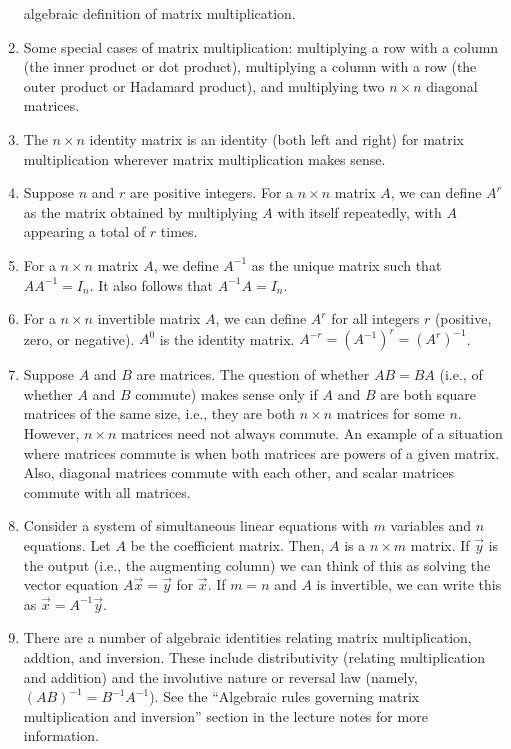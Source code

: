 \documentclass[10pt]{amsart}
\begin{document}
\begin{enumerate}
  algebraic definition of matrix multiplication.
\item Some special cases of matrix multiplication: multiplying a row
  with a column (the inner product or dot product), multiplying a
  column with a row (the outer product or Hadamard product), and
  multiplying two $n \times n$ diagonal matrices.
\item The $n \times n$ identity matrix is an identity (both left and
  right) for matrix multiplication wherever matrix multiplication
  makes sense.
\item Suppose $n$ and $r$ are positive integers. For a $n \times n$
  matrix $A$, we can define $A^r$ as the matrix obtained by
  multiplying $A$ with itself repeatedly, with $A$ appearing a total
  of $r$ times.
\item For a $n \times n$ matrix $A$, we define $A^{-1}$ as the unique
  matrix such that $AA^{-1} = I_n$. It also follows that $A^{-1}A =
  I_n$.
\item For a $n \times n$ invertible matrix $A$, we can define $A^r$
  for all integers $r$ (positive, zero, or negative). $A^0$ is the
  identity matrix. $A^{-r} = (A^{-1})^r = (A^r)^{-1}$.
\item Suppose $A$ and $B$ are matrices. The question of whether $AB =
  BA$ (i.e., of whether $A$ and $B$ commute) makes sense only if $A$
  and $B$ are both square matrices of the same size, i.e., they are
  both $n \times n$ matrices for some $n$. However, $n \times n$
  matrices need not always commute. An example of a situation where
  matrices commute is when both matrices are powers of a given
  matrix. Also, diagonal matrices commute with each other, and scalar
  matrices commute with all matrices.
\item Consider a system of simultaneous linear equations with $m$
  variables and $n$ equations. Let $A$ be the coefficient
  matrix. Then, $A$ is a $n \times m$ matrix. If $\vec{y}$ is the
  output (i.e., the augmenting column) we can think of this as solving
  the vector equation $A\vec{x} = \vec{y}$ for $\vec{x}$. If $m = n$
  and $A$ is invertible, we can write this as $\vec{x} =
  A^{-1}\vec{y}$.
\item There are a number of algebraic identities relating matrix
  multiplication, addtion, and inversion. These include distributivity
  (relating multiplication and addition) and the involutive nature or
  reversal law (namely, $(AB)^{-1} = B^{-1}A^{-1}$). See the
  ``Algebraic rules governing matrix multiplication and inversion''
  section in the lecture notes for more information.
\end{enumerate}
\end{document}
